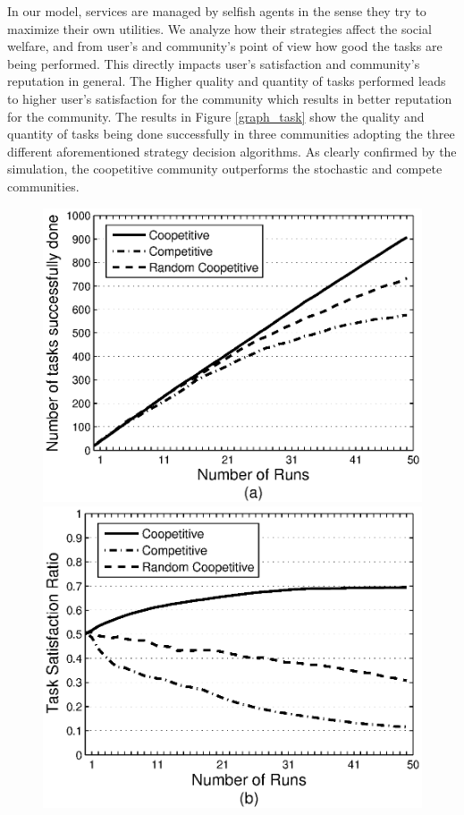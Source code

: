 In our model, services are managed by selfish agents in the sense
they try to maximize their own utilities. We analyze how their
strategies affect the social welfare, and from user's and
community's point of view how good the tasks are being performed.
This directly impacts user's satisfaction and community's
reputation in general. The Higher quality and quantity of tasks
performed leads to higher user's satisfaction for the community
which results in better reputation for the community. The results
in Figure \ref{graph_task} show the quality and quantity of tasks
being done successfully in three communities adopting the three
different aforementioned strategy decision algorithms. As clearly confirmed by the simulation, the coopetitive community
outperforms the stochastic and compete communities.

\begin{figure}[h]
\centering
\includegraphics[scale=0.35]{graphtaskdone.eps}
\includegraphics[scale=0.35]{graphtasksatisfaction.eps}

\end{figure}

